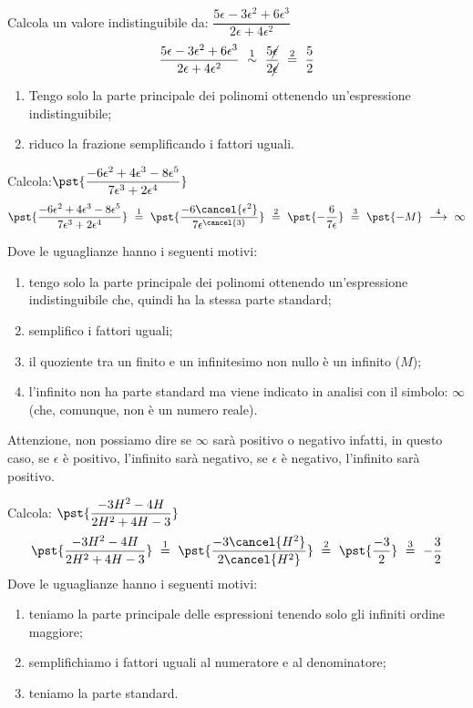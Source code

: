 \begin{esempio}
Calcola un valore indistinguibile da:
\(\dfrac{5\epsilon -3 \epsilon^2 + 6 \epsilon^3}
         {2\epsilon + 4 \epsilon^2}\)
\[\dfrac{5\epsilon -3 \epsilon^2 + 6 \epsilon^3}
         {2\epsilon + 4 \epsilon^2} 
~ \stackrel{1}{\sim} ~
  \dfrac{5 \cancel{\epsilon}}{2 \cancel{\epsilon}} 
~ \stackrel{2}{=} ~
  \dfrac{5}{2}\]
\begin{enumerate} [nosep]
 \item Tengo solo la parte principale dei polinomi ottenendo un'espressione 
indistinguibile;
 \item riduco la frazione semplificando i fattori uguali.
\end{enumerate}
\end{esempio}

\begin{esempio}
Calcola:\quad \(\pst{\dfrac{-6\epsilon^2 +4 \epsilon^3 -8 \epsilon^5}
             {7\epsilon^3 + 2 \epsilon^4}}\)
\[\pst{\dfrac{-6\epsilon^2 +4 \epsilon^3 -8 \epsilon^5}
             {7\epsilon^3 + 2 \epsilon^4}} 
~ \stackrel{1}{=} ~
  \pst{\dfrac{-6\cancel{\epsilon^2}}
             {7\epsilon^{\cancel{3}}}} 
~ \stackrel{2}{=} ~
  \pst{-\dfrac{6}{7\epsilon}}  
~ \stackrel{3}{=} ~
  \pst{-M} 
~ \stackrel{4}{\longrightarrow} ~
  \infty\]

Dove le uguaglianze hanno i seguenti motivi:
\begin{enumerate} [nosep]
 \item tengo solo la parte principale dei polinomi ottenendo un'espressione 
indistinguibile che, quindi ha la stessa parte standard;
 \item semplifico i fattori uguali;
 \item il quoziente tra un finito e un infinitesimo non nullo è un 
infinito (\(M\));
 \item l'infinito non ha parte standard ma viene indicato in analisi con 
il simbolo: \(\infty\) (che, comunque, non è un numero reale).
\end{enumerate}
\begin{osservazione}
 Attenzione, non possiamo dire se \(\infty\) sarà positivo o negativo 
infatti, in questo caso, se \(\epsilon\) è positivo, l'infinito sarà 
negativo,  se \(\epsilon\) è negativo, l'infinito sarà positivo.
\end{osservazione}
\end{esempio}

\begin{esempio}
Calcola: \quad \(\pst{\dfrac{-3H^2 -4H}{2H^2 +4H -3}}\)
\[\pst{\dfrac{-3H^2 -4H}{2H^2 +4H -3}} 
~ \stackrel{1}{=} ~
  \pst{\dfrac{-3\cancel{H^2}}{2\cancel{H^2}}} 
~ \stackrel{2}{=} ~
  \pst{\dfrac{-3}{2}} 
~ \stackrel{3}{=} ~
  -\dfrac{3}{2}\]
Dove le uguaglianze hanno i seguenti motivi:
\begin{enumerate} [nosep]
 \item teniamo la parte principale delle espressioni tenendo solo gli 
infiniti ordine maggiore; 
 \item semplifichiamo i fattori uguali al numeratore e al denominatore; 
 \item teniamo la parte standard.
\end{enumerate}
\end{esempio}

